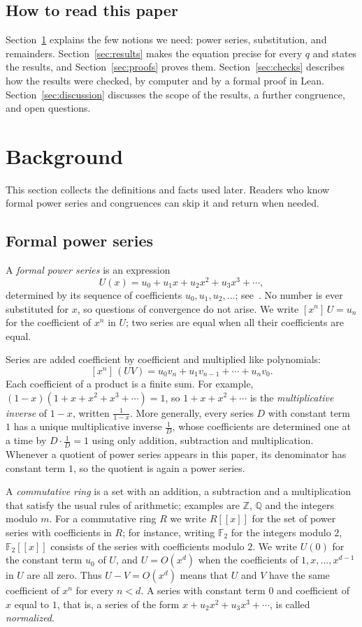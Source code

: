 \documentclass[11pt,a4paper]{article}
\theoremstyle{definition}
\theoremstyle{remark}
\newcommand{\Z}{\mathbb{Z}}
\newcommand{\Q}{\mathbb{Q}}
\newcommand{\F}{\mathbb{F}}
\newcommand{\ps}[1]{#1[[x]]}
\newcommand{\coeff}[2]{[x^{#1}]\,#2}
\begin{document}
\subsection{How to read this paper}
Section~\ref{sec:background} explains the few notions we need: power series, substitution, and remainders.
Section~\ref{sec:results} makes the equation precise for every $q$ and states the results, and
Section~\ref{sec:proofs} proves them. Section~\ref{sec:checks} describes how the results were checked, by computer
and by a formal proof in Lean. Section~\ref{sec:discussion} discusses the scope of the results, a further congruence,
and open questions.
\section{Background}\label{sec:background}
This section collects the definitions and facts used later. Readers who know formal power series and congruences can skip it and return when needed.
\subsection{Formal power series}
A \emph{formal power series} is an expression
\[
U(x)=u_0+u_1x+u_2x^2+u_3x^3+\cdots ,
\]
determined by its sequence of coefficients $u_0,u_1,u_2,\dots$; see~\cite{niven,stanley}. No number is ever
substituted for $x$, so questions of convergence do not arise. We write $\coeff{n}{U}=u_n$ for the coefficient of $x^n$ in $U$; two series are equal
when all their coefficients are equal.

Series are added coefficient by coefficient and multiplied like polynomials:
\[
\coeff{n}{(UV)}=u_0v_n+u_1v_{n-1}+\cdots+u_nv_0 .
\]
Each coefficient of a product is a finite sum. For example, $(1-x)(1+x+x^2+x^3+\cdots)=1$, so $1+x+x^2+\cdots$ is
the \emph{multiplicative inverse} of $1-x$, written $\frac{1}{1-x}$. More generally, every series $D$ with constant term
$1$ has a unique multiplicative inverse $\frac1D$, whose coefficients are determined one at a time by $D\cdot\frac1D=1$
using only addition, subtraction and multiplication. Whenever a quotient of power series appears in this paper, its
denominator has constant term $1$, so the quotient is again a power series.

A \emph{commutative ring} is a set with an addition, a subtraction and a multiplication that satisfy the usual rules
of arithmetic; examples are $\Z$, $\Q$ and the integers modulo $m$. For a commutative ring $R$ we write $\ps{R}$ for
the set of power series with coefficients in $R$; for instance, writing $\F_2$ for the integers modulo $2$, $\ps{\F_2}$
consists of the series with coefficients modulo $2$. We write
$U(0)$ for the constant term $u_0$ of $U$, and $U=O(x^d)$ when the coefficients of $1,x,\dots,x^{d-1}$ in $U$ are all
zero. Thus $U-V=O(x^d)$ means that $U$ and $V$ have the same coefficient of $x^n$ for every $n<d$. A series with
constant term $0$ and coefficient of $x$ equal to $1$, that is, a series of the form $x+u_2x^2+u_3x^3+\cdots$, is
called \emph{normalized}.
\end{document}
